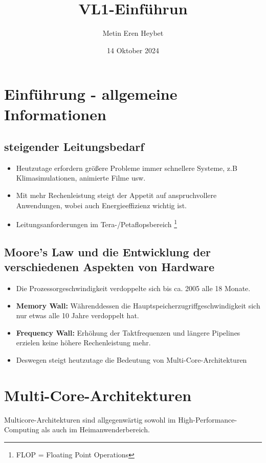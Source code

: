 \documentclass[11pt]{article}
\title{VL1-Einführun}
\author{Metin Eren Heybet}
\date{14 Oktober 2024}
\begin{document}
\maketitle

\tableofcontents
\newpage

\section{Einführung - allgemeine Informationen}

\subsection{steigender Leitungsbedarf}

\begin{itemize}
    \item Heutzutage erfordern größere Probleme immer schnellere Systeme, z.B Klimasimulationen, animierte Filme usw.
    \item Mit mehr Rechenleistung steigt der Appetit auf anspruchvollere Anwendungen, wobei auch Energieeffizienz wichtig ist.
    \item Leitungsanforderungen im Tera-/Petaflopsbereich \footnote{FLOP = Floating Point Operations}
\end{itemize}

\subsection{Moore's Law und die Entwicklung der verschiedenen Aspekten von Hardware}

\begin{itemize}
    \item Die Prozessorgeschwindigkeit verdoppelte sich bis ca. 2005 alle 18 Monate.
    \item \textbf{Memory Wall:} Währenddessen die Hauptspeicherzugriffgeschwindigkeit sich nur etwas alle 10 Jahre verdoppelt hat.
    \item \textbf{Frequency Wall:} Erhöhung der Taktfrequenzen und längere Pipelines erzielen keine höhere Rechenleistung mehr.
    \item Deswegen steigt heutzutage die Bedeutung von Multi-Core-Architekturen
\end{itemize}

\section{Multi-Core-Architekturen}
Multicore-Architekturen sind allgegenwärtig sowohl im High-Performance-Computing als auch im Heimanwenderbereich.
\end{document}
